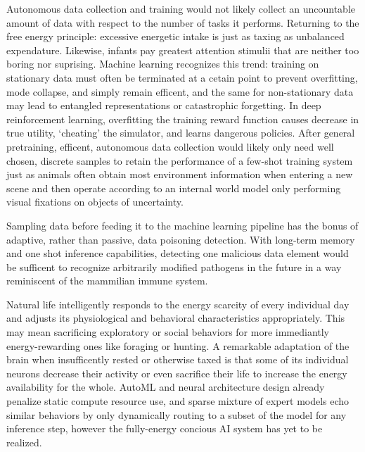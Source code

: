Autonomous data collection and training would not likely collect an uncountable amount of data with respect to the number of tasks it performs. Returning to the free energy principle: excessive energetic intake is just as taxing as unbalanced expendature. Likewise, infants pay greatest attention stimulii that are neither too boring nor suprising. Machine learning recognizes this trend: training on stationary data must often be terminated at a cetain point to prevent overfitting, mode collapse, and simply remain efficent, and the same for non-stationary data may lead to entangled representations or catastrophic forgetting. In deep reinforcement learning, overfitting the training reward function causes decrease in true utility, `cheating' the simulator, and learns dangerous policies. After general pretraining, efficent, autonomous data collection would likely only need well chosen, discrete samples to retain the performance of a few-shot training system just as animals often obtain most environment information when entering a new scene and then operate according to an internal world model only performing visual fixations on objects of uncertainty.\cite{sahni2021hard}

Sampling data before feeding it to the machine learning pipeline has the bonus of adaptive, rather than passive, data poisoning detection. With long-term memory and one shot inference capabilities, detecting one malicious data element would be sufficent to recognize arbitrarily modified pathogens in the future in a way reminiscent of the mammilian immune system.

Natural life intelligently responds to the energy scarcity of every individual day and adjusts its physiological and behavioral characteristics appropriately. This may mean sacrificing exploratory or social behaviors for more immediantly energy-rewarding ones like foraging or hunting. A remarkable adaptation of the brain when insufficently rested or otherwise taxed is that some of its individual neurons decrease their activity or even sacrifice their life to increase the energy availability for the whole. AutoML and neural architecture design already penalize static compute resource use, and sparse mixture of expert models echo similar behaviors by only dynamically routing to a subset of the model for any inference step, however the fully-energy concious AI system has yet to be realized. 
